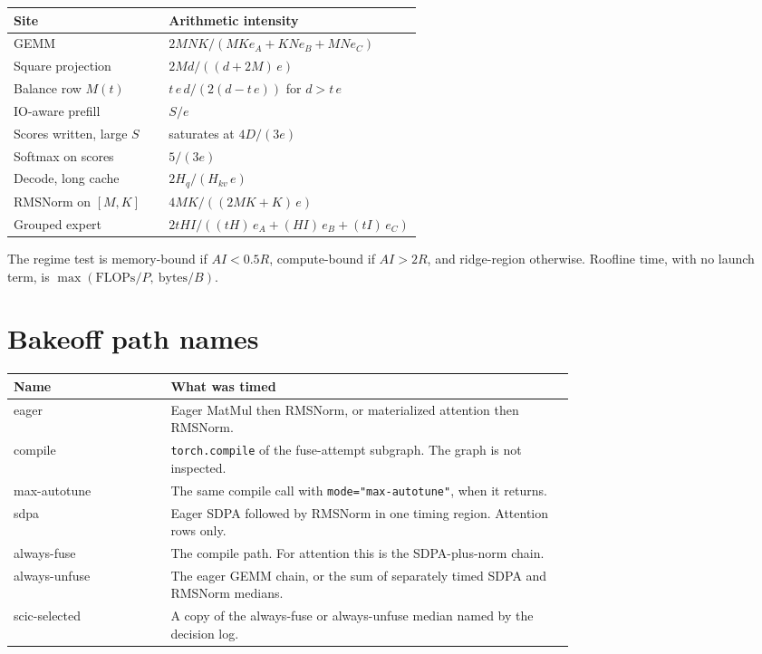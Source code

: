 \documentclass[a4paper,fleqn]{cas-dc}
\begin{document}
\begin{center}
\small
\begin{tabular}{@{}lp{0.62\linewidth}@{}}
  \toprule
  Site & Arithmetic intensity \\
  \midrule
  GEMM & $2MNK / (MK e_A + KN e_B + MN e_C)$ \\
  Square projection & $2Md / ((d + 2M)\, e)$ \\
  Balance row $M(t)$ & $t\, e\, d / (2(d - t\, e))$ for $d > t\, e$ \\
  IO-aware prefill & $S / e$ \\
  Scores written, large $S$ & saturates at $4D / (3e)$ \\
  Softmax on scores & $5 / (3e)$ \\
  Decode, long cache & $2 H_q / (H_{kv}\, e)$ \\
  RMSNorm on $[M,K]$ & $4MK / ((2MK + K)\, e)$ \\
  Grouped expert & $2 t H I / ((tH)\, e_A + (HI)\, e_B + (tI)\, e_C)$ \\
  \bottomrule
\end{tabular}
\end{center}

The regime test is memory-bound if $AI < 0.5R$, compute-bound if $AI > 2R$, and ridge-region otherwise.
Roofline time, with no launch term, is $\max(\mathrm{FLOPs}/P,\ \mathrm{bytes}/B)$.

\section{Bakeoff path names}
\label{app:paths}

\begin{center}
\small
\begin{tabular}{@{}lp{0.72\linewidth}@{}}
  \toprule
  Name & What was timed \\
  \midrule
  eager & Eager MatMul then RMSNorm, or materialized attention then RMSNorm. \\
  compile & \texttt{torch.compile} of the fuse-attempt subgraph. The graph is not inspected. \\
  max-autotune & The same compile call with \texttt{mode="max-autotune"}, when it returns. \\
  sdpa & Eager SDPA followed by RMSNorm in one timing region. Attention rows only. \\
  always-fuse & The compile path. For attention this is the SDPA-plus-norm chain. \\
  always-unfuse & The eager GEMM chain, or the sum of separately timed SDPA and RMSNorm medians. \\
  scic-selected & A copy of the always-fuse or always-unfuse median named by the decision log. \\
  \bottomrule
\end{tabular}
\end{center}
\end{document}
